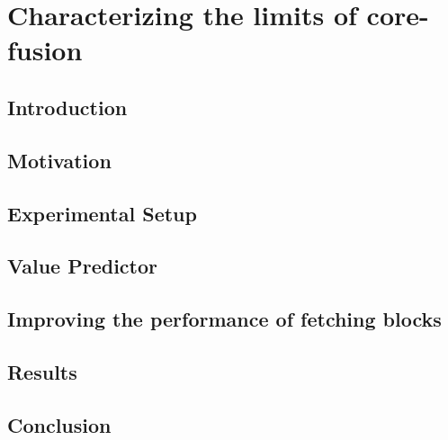 \chapter{Characterizing the limits of core-fusion}

\section{Introduction}\label{sect:introduction-chapter3}

\section{Motivation}\label{sect:ch3-motivation}

\section{Experimental Setup}
\label{chp:chp3:sec:exp}
\section{Value Predictor}

\section{Improving the performance of fetching blocks}\label{chp3:sec:fetch}

\section{Results}
\label{chp:chp3:sec:analysis}
\section{Conclusion}
%
%
%